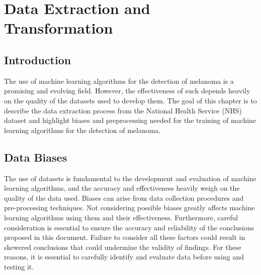 \chapter{Data Extraction and Transformation}

\section{Introduction}
The use of machine learning algorithms for the detection of melanoma is a promising and evolving field. However, the effectiveness of such depends heavily on the quality of the datasets used to develop them. The goal of this chapter is to describe the data extraction process from the National Health Service (NHS) dataset and highlight biases and preprocessing needed for the training of machine learning algorithms for the detection of melanoma.  

\section{Data Biases}
The use of datasets is fundamental to the development and evaluation of machine learning algorithms, and the accuracy and effectiveness heavily weigh on the quality of the data used. Biases can arise from data collection procedures and pre-processing techniques. Not considering possible biases greatly affects machine learning algorithms using them and their effectiveness. Furthermore, careful consideration is essential to ensure the accuracy and reliability of the conclusions proposed in this document. Failure to consider all these factors could result in skewered conclusions that could undermine the validity of findings. For these reasons, it is essential to carefully identify and evaluate data before using and testing it.

